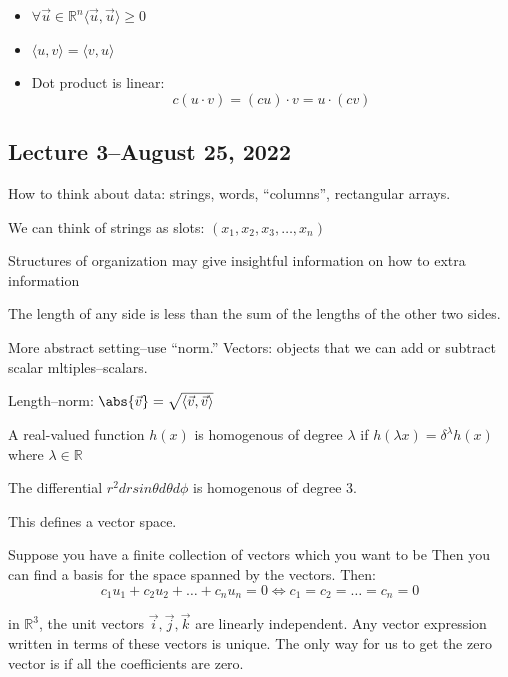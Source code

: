 \documentclass{scrreprt}
\begin{document}
\begin{itemize}
	\item $\forall \vec{u}\in \mathbb{R}^n \langle \vec{u}, \vec{u}\rangle \geq 0$
	\item $\langle u, v \rangle = \langle v, u \rangle$
	\item Dot product is linear: \[
		      c(u\cdot v) = (cu)\cdot v = u\cdot (cv)
	      \]
\end{itemize}

\subsection{Lecture 3--August 25, 2022}

How to think about data: strings, words, ``columns'', rectangular arrays.

We can think of strings as slots: $(x_1, x_2, x_3, \ldots, x_n)$

Structures of organization may give insightful information on how to extra information

\begin{definition}
	The length of any side is less than the sum of the lengths of the other two sides.
\end{definition}

More abstract setting--use ``norm.'' Vectors: objects that we can add or subtract scalar mltiples--scalars.

Length--norm: $\abs{\vec{v}}=\sqrt{\langle \vec{v}, \vec{v}\rangle}$

\begin{definition}[Homogenous]
	A real-valued function $h(x)$ is homogenous of degree $\lambda$
	if $h(\lambda x)=\delta^\lambda h(x)$ where $\lambda \in \mathbb{R}$

	The differential $r^2drsin\theta d\theta d\phi$ is homogenous of degree $3$.

	This defines a vector space.
\end{definition}

\begin{remark}
	Suppose you have a finite collection of vectors which you want to be 
	Then you can find a basis for the space spanned by the vectors. Then:
	\[
		c_1u_1 + c_2u_2 + \ldots + c_nu_n = 0 \Leftrightarrow c_1=c_2=\ldots=c_n=0
	\]

	in $\mathbb{R}^3$, the unit vectors $\vec{i}, \vec{j}, \vec{k}$ are linearly independent.
	Any vector expression written in terms of these vectors is unique. The only way
	for us to get the zero vector is if all the coefficients are zero.

\end{remark}
\end{document}
